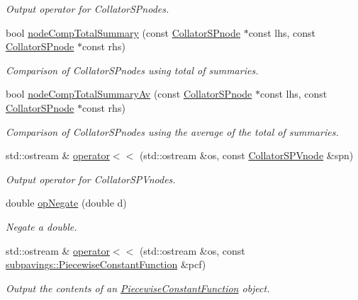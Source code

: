 \begin{DoxyCompactItemize}
\begin{DoxyCompactList}\small\item\em \-Output operator for \-Collator\-S\-Pnodes. \end{DoxyCompactList}\item 
bool \hyperlink{namespacesubpavings_a31f92daeace87913f55ad41125368359}{node\-Comp\-Total\-Summary} (const \hyperlink{classsubpavings_1_1CollatorSPnode}{\-Collator\-S\-Pnode} $\ast$const lhs, const \hyperlink{classsubpavings_1_1CollatorSPnode}{\-Collator\-S\-Pnode} $\ast$const rhs)
\begin{DoxyCompactList}\small\item\em \-Comparison of \-Collator\-S\-Pnodes using total of summaries. \end{DoxyCompactList}\item 
bool \hyperlink{namespacesubpavings_a3580c30693d7d662e28a0fa26f45f837}{node\-Comp\-Total\-Summary\-Av} (const \hyperlink{classsubpavings_1_1CollatorSPnode}{\-Collator\-S\-Pnode} $\ast$const lhs, const \hyperlink{classsubpavings_1_1CollatorSPnode}{\-Collator\-S\-Pnode} $\ast$const rhs)
\begin{DoxyCompactList}\small\item\em \-Comparison of \-Collator\-S\-Pnodes using the average of the total of summaries. \end{DoxyCompactList}\item 
std\-::ostream \& \hyperlink{namespacesubpavings_a6cbced3edaaea51ec4f60020f4b68410}{operator$<$$<$} (std\-::ostream \&os, const \hyperlink{classsubpavings_1_1CollatorSPVnode}{\-Collator\-S\-P\-Vnode} \&spn)
\begin{DoxyCompactList}\small\item\em \-Output operator for \-Collator\-S\-P\-Vnodes. \end{DoxyCompactList}\item 
double \hyperlink{namespacesubpavings_a97b57336ffc5ebac59abfb36dbd5405b}{op\-Negate} (double d)
\begin{DoxyCompactList}\small\item\em \-Negate a double. \end{DoxyCompactList}\item 
std\-::ostream \& \hyperlink{namespacesubpavings_a014371dd680ff6750f99952e6eb92cf9}{operator$<$$<$} (std\-::ostream \&os, const \hyperlink{classsubpavings_1_1PiecewiseConstantFunction}{subpavings\-::\-Piecewise\-Constant\-Function} \&pcf)
\begin{DoxyCompactList}\small\item\em \-Output the contents of an \hyperlink{classsubpavings_1_1PiecewiseConstantFunction}{\-Piecewise\-Constant\-Function} object. \end{DoxyCompactList}\item 

\end{DoxyCompactItemize}
